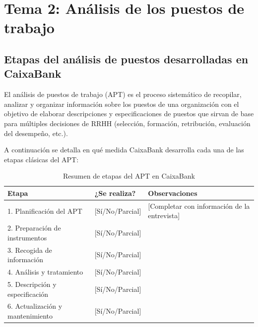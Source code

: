 %
%

\section{Tema 2: Análisis de los puestos de trabajo}

\subsection{Etapas del análisis de puestos desarrolladas en CaixaBank}

El análisis de puestos de trabajo (APT) es el proceso sistemático de recopilar,
analizar y organizar información sobre los puestos de una organización con el
objetivo de elaborar descripciones y especificaciones de puestos que sirvan de
base para múltiples decisiones de RRHH (selección, formación, retribución,
evaluación del desempeño, etc.).

A continuación se detalla en qué medida CaixaBank desarrolla cada una de las
etapas clásicas del APT:

\begin{table}[H]
  \centering
  \small
  \caption{Resumen de etapas del APT en CaixaBank}
  \begin{tabularx}{\textwidth}{p{} p{} X}
    \toprule
    \textbf{Etapa} & \textbf{¿Se realiza?} & \textbf{Observaciones} \\
    \midrule
    1. Planificación del APT    & [Sí/No/Parcial] & [Completar con información de la entrevista] \\
    2. Preparación de instrumentos & [Sí/No/Parcial] & \\
    3. Recogida de información  & [Sí/No/Parcial] & \\
    4. Análisis y tratamiento   & [Sí/No/Parcial] & \\
    5. Descripción y especificación & [Sí/No/Parcial] & \\
    6. Actualización y mantenimiento & [Sí/No/Parcial] & \\
    \bottomrule
  \end{tabularx}
\end{table}


